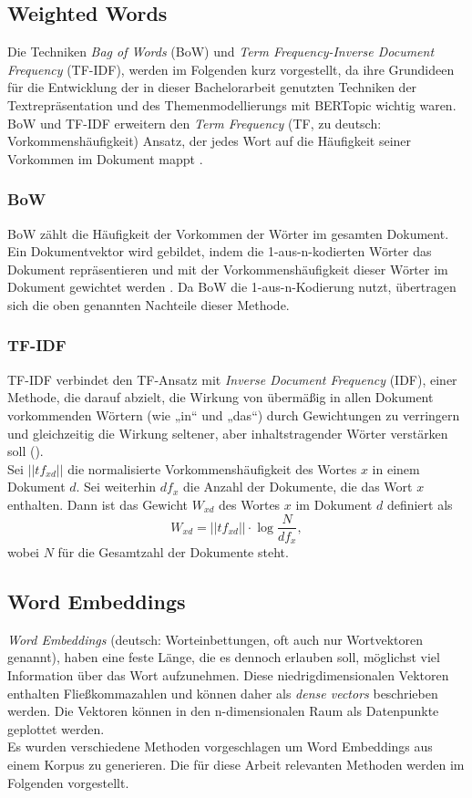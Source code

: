 \documentclass[ngerman]{ttlab-qualify}
\begin{document}
\subsection{Weighted Words}
Die Techniken \textit{Bag of Words} (BoW) und \textit{Term Frequency-Inverse Document Frequency} (TF-IDF), werden im Folgenden kurz vorgestellt, da ihre Grundideen für die Entwicklung der in dieser Bachelorarbeit genutzten Techniken der Textrepräsentation und des Themenmodellierungs mit BERTopic wichtig waren.\\
BoW und TF-IDF erweitern den \textit{Term Frequency} (TF, zu deutsch: Vorkommenshäufigkeit) Ansatz, der jedes Wort auf die Häufigkeit seiner Vorkommen im Dokument mappt \parencite{Kowsari_2019}.

\subsubsection{BoW} \label{BOW}
BoW zählt die Häufigkeit der Vorkommen der Wörter im gesamten Dokument. Ein Dokumentvektor wird gebildet, indem die 1-aus-n-kodierten Wörter das Dokument repräsentieren und mit der Vorkommenshäufigkeit dieser Wörter im Dokument gewichtet werden \parencite{Kowsari_2019}. Da BoW die 1-aus-n-Kodierung nutzt, übertragen sich die oben genannten Nachteile dieser Methode.
\subsubsection{TF-IDF} \label{TF-IDF}
TF-IDF verbindet den TF-Ansatz mit \textit{Inverse Document Frequency} (IDF), einer Methode, die darauf abzielt, die Wirkung von übermäßig in allen Dokument vorkommenden Wörtern (wie „in“ und „das“) durch Gewichtungen zu verringern und gleichzeitig die Wirkung seltener, aber inhaltstragender Wörter verstärken soll (\cite{Kowsari_2019}).\\
Sei \(||tf_{xd}||\) die normalisierte Vorkommenshäufigkeit des Wortes $x$ in einem Dokument $d$. Sei weiterhin \(df_{x}\) die Anzahl der Dokumente, die das Wort $x$ enthalten. Dann ist das Gewicht \(W_{xd}\) des Wortes $x$ im Dokument $d$ definiert als
\[W_{xd} = ||tf_{xd}||\cdot\log\frac{N}{df_x},\]
wobei $N$ für die Gesamtzahl der Dokumente steht.

\subsection{Word Embeddings} \label{Word Embeddings}
\textit{Word Embeddings} (deutsch: Worteinbettungen, oft auch nur Wortvektoren genannt), haben eine feste Länge, die es dennoch erlauben soll, möglichst viel Information über das Wort aufzunehmen. Diese niedrigdimensionalen Vektoren enthalten Fließkommazahlen und können daher als \textit{dense vectors} beschrieben werden. Die Vektoren können in den n-dimensionalen Raum als Datenpunkte geplottet werden.\\
Es wurden verschiedene Methoden vorgeschlagen um Word Embeddings aus einem Korpus zu generieren. Die für diese Arbeit relevanten Methoden werden im Folgenden vorgestellt.
\end{document}
